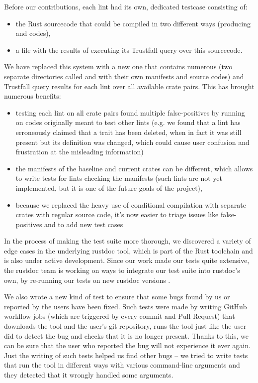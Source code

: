 \documentclass[licencjacka,en]{pracamgr}
\begin{document}
Before our contributions, each lint had its own, dedicated testcase consisting of:
\begin{itemize}
\item the Rust sourcecode that could be compiled in two different ways (producing
 and  codes),
\item a file with the results of executing its Trustfall query over this sourcecode.
\end{itemize}
We have replaced this system with a new one that contains numerous 
(two separate directories called  and  with their own
manifests and source codes) and Trustfall query results for each lint over all
available crate pairs. This has brought numerous benefits:
\begin{itemize}
	\item testing each lint on all crate pairs found multiple false-positives by running
		on codes originally meant to test other lints
		(e.g. we found that a lint has erroneously claimed that a trait
		has been deleted, when in fact it was still present but its definition
		was changed, which could cause user confusion and frustration at the
		misleading information)
	\item the manifests of the baseline and current crates can be different,
		which allows to write tests for lints checking the manifests
		(such lints are not yet implemented, but it is one of the future goals
		of the project),
	\item because we replaced the heavy use of conditional compilation with separate crates with regular source code,
	    it's now easier to triage issues like false-positives and to add new test cases
\end{itemize}
In the process of making the test suite more thorough,
we discovered a variety of edge cases in the underlying rustdoc tool,
which is part of the Rust toolchain and is also under active development.
Since our work made our tests quite extensive,
the rustdoc team is working on ways to integrate our test suite into rustdoc's own,
by re-running our tests on new rustdoc versions \cite{issue-rustdoc-our-tests}.

We also wrote a new kind of test to ensure that some bugs found by us or reported by the users have been fixed.
Such tests were made by writing GitHub workflow jobs (which are triggered by every
commit and Pull Request) that downloads the tool and the user's git repository,
runs the tool just like the user did to detect the bug
and checks that it is no longer present.
Thanks to this, we can be sure that the user who reported the bug
will not experience it ever again.
Just the writing of such tests helped us find other bugs
-- we tried to write tests that run the tool in different ways
with various command-line arguments and they detected that it wrongly handled some arguments.
\end{document}
